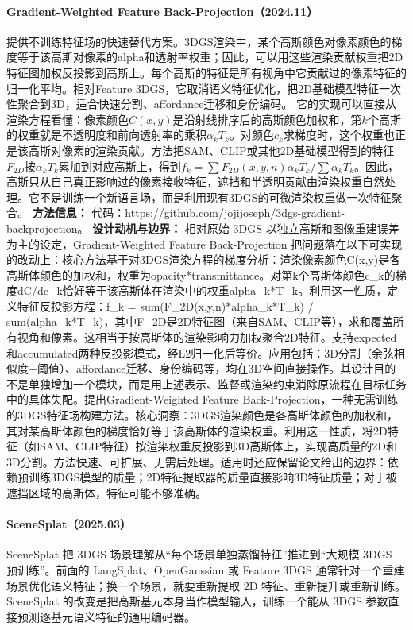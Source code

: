 \paragraph{Gradient-Weighted Feature Back-Projection（2024.11）\cite{2411_15193}}
提供不训练特征场的快速替代方案。3DGS渲染中，某个高斯颜色对像素颜色的梯度等于该高斯对像素的alpha和透射率权重；因此，可以用这些渲染贡献权重把2D特征图加权反投影到高斯上。每个高斯的特征是所有视角中它贡献过的像素特征的归一化平均。相对Feature 3DGS，它取消语义特征优化，把2D基础模型特征一次性聚合到3D，适合快速分割、affordance迁移和身份编码。
它的实现可以直接从渲染方程看懂：像素颜色$C(x,y)$是沿射线排序后的高斯颜色加权和，第$k$个高斯的权重就是不透明度和前向透射率的乘积$\alpha_k T_k$。对颜色$c_k$求梯度时，这个权重也正是该高斯对像素的渲染贡献。方法把SAM、CLIP或其他2D基础模型得到的特征$F_{2D}$按$\alpha_k T_k$累加到对应高斯上，得到$f_k=\sum F_{2D}(x,y,n)\alpha_kT_k / \sum \alpha_kT_k$。因此，高斯只从自己真正影响过的像素接收特征，遮挡和半透明贡献由渲染权重自然处理。它不是训练一个新语言场，而是利用现有3DGS的可微渲染权重做一次特征聚合。
\textbf{方法信息：} 代码：\url{https://github.com/jojijoseph/3dgs-gradient-backprojection}。
\textbf{设计动机与边界：} 相对原始 3DGS 以独立高斯和图像重建误差为主的设定，Gradient-Weighted Feature Back-Projection 把问题落在以下可实现的改动上：核心方法基于对3DGS渲染方程的梯度分析：渲染像素颜色C(x,y)是各高斯体颜色的加权和，权重为opacity*transmittance。对第k个高斯体颜色c\_k的梯度dC/dc\_k恰好等于该高斯体在渲染中的权重alpha\_k*T\_k。利用这一性质，定义特征反投影方程：f\_k = sum(F\_2D(x,y,n)*alpha\_k*T\_k) / sum(alpha\_k*T\_k)，其中F\_2D是2D特征图（来自SAM、CLIP等），求和覆盖所有视角和像素。这相当于按高斯体的渲染影响力加权聚合2D特征。支持expected和accumulated两种反投影模式，经L2归一化后等价。应用包括：3D分割（余弦相似度+阈值）、affordance迁移、身份编码等，均在3D空间直接操作。其设计目的不是单独增加一个模块，而是用上述表示、监督或渲染约束消除原流程在目标任务中的具体失配。提出Gradient-Weighted Feature Back-Projection，一种无需训练的3DGS特征场构建方法。核心洞察：3DGS渲染颜色是各高斯体颜色的加权和，其对某高斯体颜色的梯度恰好等于该高斯体的渲染权重。利用这一性质，将2D特征（如SAM、CLIP特征）按渲染权重反投影到3D高斯体上，实现高质量的2D和3D分割。方法快速、可扩展、无需后处理。适用时还应保留论文给出的边界：依赖预训练3DGS模型的质量；2D特征提取器的质量直接影响3D特征质量；对于被遮挡区域的高斯体，特征可能不够准确。
\paragraph{SceneSplat（2025.03）\cite{2503_18052}}
SceneSplat 把 3DGS 场景理解从“每个场景单独蒸馏特征”推进到“大规模 3DGS 预训练”。前面的 LangSplat、OpenGaussian 或 Feature 3DGS 通常针对一个重建场景优化语义特征；换一个场景，就要重新提取 2D 特征、重新提升或重新训练。SceneSplat 的改变是把高斯基元本身当作模型输入，训练一个能从 3DGS 参数直接预测逐基元语义特征的通用编码器。

